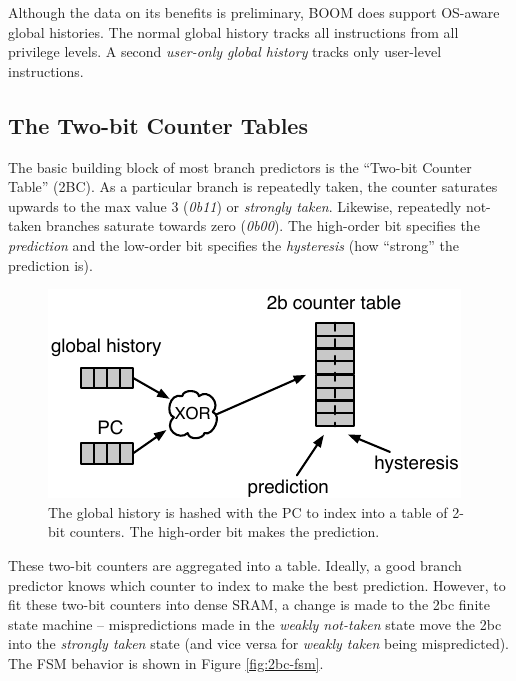 Although the data on its benefits is preliminary, BOOM does support OS-aware global histories.  The normal global history tracks all instructions from all privilege levels. A second {\em user-only global history} tracks only user-level instructions. 

\subsection{The Two-bit Counter Tables}

The basic building block of most branch predictors is the ``Two-bit Counter Table'' (2BC).  As a particular branch is repeatedly taken, the counter saturates upwards to the max value 3 ({\em 0b11}) or {\em strongly taken}.  Likewise, repeatedly not-taken branches saturate towards zero ({\em 0b00}).  The high-order bit specifies the {\em prediction} and the low-order bit specifies the {\em hysteresis} (how ``strong'' the prediction is).


\begin{figure}[ht]
	\centering
	\centerline{\includegraphics[scale =1.4] {figures/2bc-prediction}}
	\caption{ \small The global history is hashed with the PC to index into a table of 2-bit counters.  The high-order bit makes the prediction.}
	\label{fig:2bc-prediction}
\end{figure}


These two-bit counters are aggregated into a table. Ideally, a good branch predictor knows which counter to index to make the best prediction. However, to fit these two-bit counters into dense SRAM, a change is made to the 2bc finite state machine -- mispredictions made in the {\em weakly not-taken} state move the 2bc into the {\em strongly taken} state (and vice versa for {\em weakly taken} being mispredicted). The FSM behavior is shown in Figure \ref{fig:2bc-fsm}.

